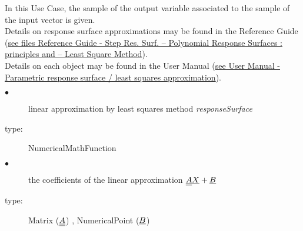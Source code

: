 \renewcommand{\filename}{docUC_RespSurface_LeastSquaresApprox2.tex}
\renewcommand{\filetitle}{UC : Linear Least Squares approximation from a sample of the input vector and a sample of the output vector}

\HeaderIIILevel

\label{leastSquareApprox2}




In this Use Case,  the  sample of the output variable associated to the sample of the input vector is given.\\



Details on response surface approximations may be found in the Reference Guide (\href{OpenTURNS_ReferenceGuide.pdf}{see files Reference Guide - Step Res. Surf. -- Polynomial Response Surfaces : principles and -- Least Square Method}).\\

Details on each object may be found in the User Manual  (\href{OpenTURNS_UserManual_TUI.pdf}{see User Manual - Parametric response surface / least squares approximation}).\\



{
  \begin{description}
  \item[$\bullet$] linear approximation by least squares method {\itshape responseSurface}
  \item[type:] NumericalMathFunction
  \item[$\bullet$]  the coefficients of the linear approximation ${\underline{{\underline{A}}}}{\underline{X}} + {\underline{B}}$
  \item[type:] Matrix (${\underline{{\underline{A}}}}$) , NumericalPoint (${\underline{B}}$)
  \end{description}
}

